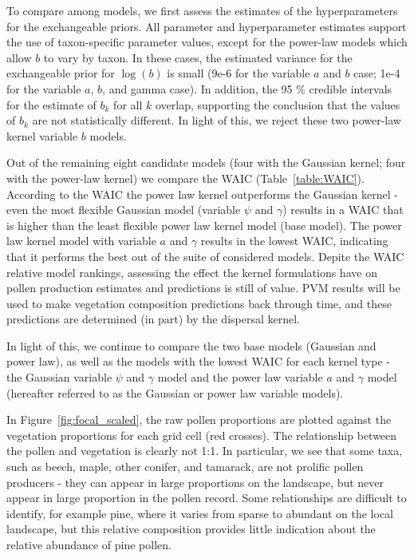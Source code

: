 \documentclass[12pt]{article}
\begin{document}
To compare among models, we first assess the estimates of the
hyperparameters for the exchangeable priors. All parameter and
hyperparameter estimates support the use of taxon-specific parameter
values, except for the power-law models which allow $b$ to vary by
taxon. In these cases, the estimated variance for the exchangeable
prior for $\log ( b )$ is small (9e-6 for the variable $a$ and $b$ case;
1e-4 for the variable $a$, $b$, and gamma case). In addition, the 95 \%
credible intervals for the estimate of $b_k$ for all $k$ overlap,
supporting the conclusion that the values of $b_k$ are not
statistically different. In light of this, we reject these two
power-law kernel variable $b$ models. 

Out of the remaining eight candidate models (four with the Gaussian
kernel; four with the power-law kernel) we compare the WAIC
(Table~\ref{table:WAIC}). According to the WAIC the power law kernel
outperforms the Gaussian kernel - even the most flexible Gaussian
model (variable $\psi$ and $\gamma$) results in a WAIC that is higher
than the least flexible power law kernel model (base model). The power
law kernel model with variable $a$ and $\gamma$ results in the lowest
WAIC, indicating that it performs the best out of the suite of
considered models. Depite the WAIC relative model rankings, assessing
the effect the kernel formulations have on pollen production estimates
and predictions is still of value. PVM results will be used to make
vegetation composition predictions back through time, and these
predictions are determined (in part) by the dispersal kernel.

In light of this, we continue to compare the two base models (Gaussian
and power law), as well as the models with the lowest WAIC for each
kernel type - the Gaussian variable $\psi$ and $\gamma$ model and the
power law variable $a$ and $\gamma$ model (hereafter referred to as
the Gaussian or power law variable models).

In Figure~\ref{fig:focal_scaled}, the raw pollen proportions are
plotted against the vegetation proportions for each grid cell (red
crosses). The relationship between the pollen and vegetation is
clearly not 1:1. In particular, we see that some taxa, such as beech,
maple, other conifer, and tamarack, are not prolific pollen producers
- they can appear in large proportions on the landscape, but never
appear in large proportion in the pollen record. Some relationships
are difficult to identify, for example pine, where it varies from
sparse to abundant on the local landscape, but this relative
composition provides little indication about the relative abundance of
pine pollen.
\end{document}
